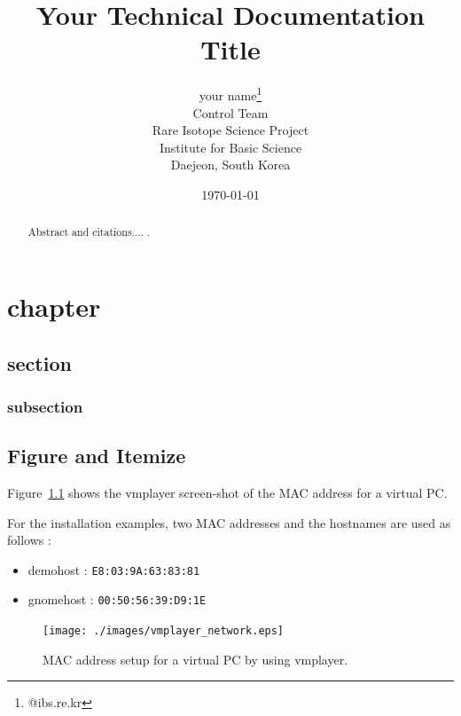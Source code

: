 \documentclass[11pt
  , a4paper
  , article
  , oneside
]{memoir}
\begin{document}
\newcommand{\technumber}{
  RAON Control-Document Series\\
  Revision : v0.1,   Release : a fixed date}
\title{\textbf{Your Technical Documentation \\Title}}



\author{your name\thanks{@ibs.re.kr} \\
  Control Team \\
  Rare Isotope Science Project\\
  Institute for Basic Science\\
  Daejeon, South Korea
}

\date{\today}

\renewcommand{\maketitlehooka}{\begin{flushright}\textsf{\technumber}\end{flushright}}

\maketitle

\begin{abstract}
Abstract and citations.... \citep{FAI}. 
\end{abstract}



\chapter{chapter}

\section{section}
\subsection{subsection}

\section{Figure and Itemize}
 Figure~\ref{fig:vmplayer_network} shows the vmplayer screen-shot of the MAC address for a virtual PC.

For the installation examples, two MAC addresses and the hostnames are used as follows :
\begin{itemize}
\item demohost  : \texttt{E8:03:9A:63:83:81}
\item gnomehost : \texttt{00:50:56:39:D9:1E}
\end{itemize}
\begin{figure}[!htb]
  \centering
  \texttt{[image: ./images/vmplayer\_network.eps]}
  \caption{
            MAC address setup for a virtual PC by using vmplayer.
          }
  \label{fig:vmplayer_network}   
\end{figure}
\end{document}
